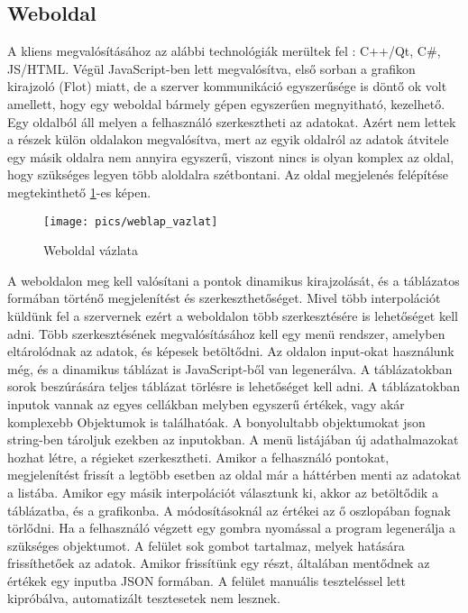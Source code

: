 \subsection{Weboldal}
	A kliens megvalósításához az alábbi technológiák merültek fel : C++/Qt, C\#, JS/HTML. Végül JavaScript-ben lett megvalósítva, első sorban a grafikon kirajzoló (Flot) miatt, de a szerver kommunikáció egyszerűsége is döntő ok volt amellett, hogy egy weboldal bármely gépen egyszerűen megnyitható, kezelhető.\newline
	Egy oldalból áll melyen a felhasználó szerkesztheti az adatokat. Azért nem lettek a részek külön oldalakon megvalósítva, mert az egyik oldalról az adatok átvitele egy másik oldalra nem annyira egyszerű, viszont nincs is olyan komplex az oldal, hogy szükséges legyen több aloldalra szétbontani. 
	Az oldal megjelenés felépítése megtekinthető \ref{fig:weblap_vazlat}-es képen.
	\begin{figure}[h]
	\texttt{[image: pics/weblap\_vazlat]}
	\centering
	\caption{Weboldal vázlata\label{fig:weblap_vazlat}}
	\end{figure}
	A weboldalon meg kell valósítani a pontok dinamikus kirajzolását, és a táblázatos formában történő megjelenítést és szerkeszthetőséget. Mivel több interpolációt küldünk fel a szervernek ezért a weboldalon több szerkesztésére is lehetőséget kell adni. \newline 
	Több szerkesztésének megvalósításához kell egy menü rendszer, amelyben eltárolódnak az adatok, és képesek betöltődni.\newline
	Az oldalon input-okat használunk még, és a dinamikus táblázat is JavaScript-ből van legenerálva. A táblázatokban sorok beszúrására teljes táblázat törlésre is lehetőséget kell adni. 
	A táblázatokban inputok vannak az egyes cellákban melyben egyszerű értékek, vagy akár komplexebb Objektumok is találhatóak. A bonyolultabb objektumokat json string-ben tároljuk ezekben az inputokban. \newline
	A menü listájában új adathalmazokat hozhat létre, a régieket szerkesztheti.
	Amikor a felhasználó pontokat, megjelenítést frissít a legtöbb esetben az oldal már a háttérben menti az adatokat a listába. Amikor egy másik interpolációt választunk ki, akkor az betöltődik a táblázatba, és a grafikonba. A módosításoknál az értékei az ő oszlopában fognak törlődni.
	Ha a felhasználó végzett egy gombra nyomással a program legenerálja a szükséges objektumot. \newline
	A felület sok gombot tartalmaz, melyek hatására frissíthetőek az adatok. Amikor frissítünk egy részt, általában mentődnek az értékek egy inputba JSON formában.\newline
	A felület manuális teszteléssel lett kipróbálva, automatizált tesztesetek nem lesznek.
